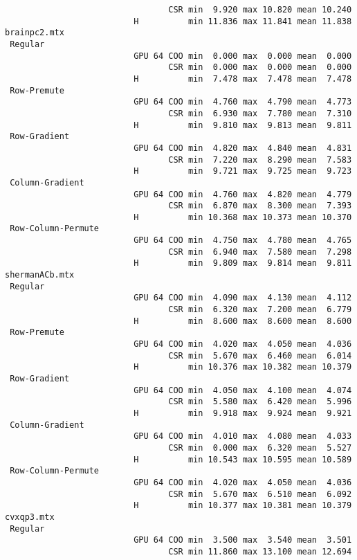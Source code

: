 {\begin{verbatim}
                                 CSR min  9.920 max 10.820 mean 10.240
                          H          min 11.836 max 11.841 mean 11.838
brainpc2.mtx
 Regular
                          GPU 64 COO min  0.000 max  0.000 mean  0.000
                                 CSR min  0.000 max  0.000 mean  0.000
                          H          min  7.478 max  7.478 mean  7.478
 Row-Premute
                          GPU 64 COO min  4.760 max  4.790 mean  4.773
                                 CSR min  6.930 max  7.780 mean  7.310
                          H          min  9.810 max  9.813 mean  9.811
 Row-Gradient
                          GPU 64 COO min  4.820 max  4.840 mean  4.831
                                 CSR min  7.220 max  8.290 mean  7.583
                          H          min  9.721 max  9.725 mean  9.723
 Column-Gradient
                          GPU 64 COO min  4.760 max  4.820 mean  4.779
                                 CSR min  6.870 max  8.300 mean  7.393
                          H          min 10.368 max 10.373 mean 10.370
 Row-Column-Permute
                          GPU 64 COO min  4.750 max  4.780 mean  4.765
                                 CSR min  6.940 max  7.580 mean  7.298
                          H          min  9.809 max  9.814 mean  9.811
shermanACb.mtx
 Regular
                          GPU 64 COO min  4.090 max  4.130 mean  4.112
                                 CSR min  6.320 max  7.200 mean  6.779
                          H          min  8.600 max  8.600 mean  8.600
 Row-Premute
                          GPU 64 COO min  4.020 max  4.050 mean  4.036
                                 CSR min  5.670 max  6.460 mean  6.014
                          H          min 10.376 max 10.382 mean 10.379
 Row-Gradient
                          GPU 64 COO min  4.050 max  4.100 mean  4.074
                                 CSR min  5.580 max  6.420 mean  5.996
                          H          min  9.918 max  9.924 mean  9.921
 Column-Gradient
                          GPU 64 COO min  4.010 max  4.080 mean  4.033
                                 CSR min  0.000 max  6.320 mean  5.527
                          H          min 10.543 max 10.595 mean 10.589
 Row-Column-Permute
                          GPU 64 COO min  4.020 max  4.050 mean  4.036
                                 CSR min  5.670 max  6.510 mean  6.092
                          H          min 10.377 max 10.381 mean 10.379
cvxqp3.mtx
 Regular
                          GPU 64 COO min  3.500 max  3.540 mean  3.501
                                 CSR min 11.860 max 13.100 mean 12.694

\end{verbatim}}
